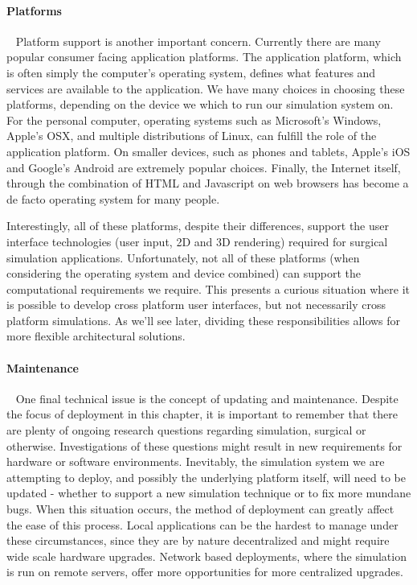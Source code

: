 \paragraph{Platforms}~ Platform support is another important
concern. Currently there are many popular consumer facing application
platforms. The application platform, which is often simply the
computer's operating system, defines what features and services are
available to the application. We have many choices in choosing these
platforms, depending on the device we which to run
our simulation system on. For the personal computer, operating systems such as
Microsoft's Windows, Apple's OSX, and multiple distributions of Linux,
can fulfill the role of the application platform. On smaller devices,
such as phones and tablets, Apple's iOS and Google's Android are
extremely popular choices. Finally, the Internet itself, through the
combination of HTML and Javascript on web browsers has become a de
facto operating system for many people.

Interestingly, all of these platforms, despite their differences,
support the user interface technologies (user input, 2D and 3D
rendering) required for surgical simulation
applications. Unfortunately, not all of these platforms (when
considering the operating system and device combined) can support the
computational requirements we require. This presents a curious
situation where it is possible to develop cross platform user
interfaces, but not necessarily cross platform simulations. As we'll
see later, dividing these responsibilities allows for more flexible
architectural solutions.

\paragraph{Maintenance}~ One final technical issue is the concept of
updating and maintenance. Despite the focus of deployment in this
chapter, it is important to remember that there are plenty of ongoing
research questions regarding simulation, surgical or
otherwise. Investigations of these questions might result in new
requirements for hardware or software environments. Inevitably, the
simulation system we are attempting to deploy, and possibly the
underlying platform itself, will need to be updated - whether to support a
new simulation technique or to fix more mundane bugs. When this
situation occurs, the method of deployment can greatly affect the ease
of this process. Local applications can be the hardest to manage under
these circumstances, since they are by nature decentralized and might
require wide scale hardware upgrades. Network based deployments, where
the simulation is run on remote servers, offer more opportunities for
more centralized upgrades.

